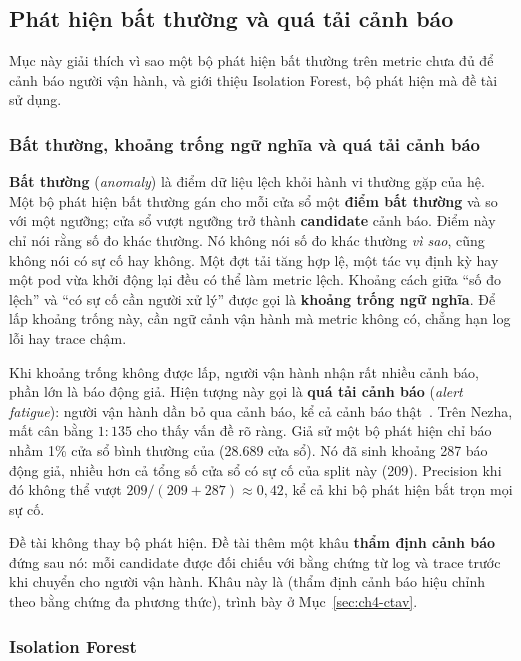 \subsection{Phát hiện bất thường và quá tải cảnh báo}
\label{sec:ch2-phat-hien}

Mục này giải thích vì sao một bộ phát hiện bất thường trên metric chưa đủ để cảnh báo người vận hành, và giới thiệu Isolation Forest, bộ phát hiện mà đề tài sử dụng.

\subsubsection{Bất thường, khoảng trống ngữ nghĩa và quá tải cảnh báo}
\label{sec:ch2-khoang-trong}

\textbf{Bất thường} (\emph{anomaly}) là điểm dữ liệu lệch khỏi hành vi thường gặp của hệ. Một bộ phát hiện bất thường gán cho mỗi cửa sổ một \textbf{điểm bất thường} và so với một ngưỡng; cửa sổ vượt ngưỡng trở thành \textbf{candidate} cảnh báo. Điểm này chỉ nói rằng số đo khác thường. Nó không nói số đo khác thường \emph{vì sao}, cũng không nói có sự cố hay không. Một đợt tải tăng hợp lệ, một tác vụ định kỳ hay một pod vừa khởi động lại đều có thể làm metric lệch. Khoảng cách giữa ``số đo lệch'' và ``có sự cố cần người xử lý'' được gọi là \textbf{khoảng trống ngữ nghĩa}. Để lấp khoảng trống này, cần ngữ cảnh vận hành mà metric không có, chẳng hạn log lỗi hay trace chậm.

Khi khoảng trống không được lấp, người vận hành nhận rất nhiều cảnh báo, phần lớn là báo động giả. Hiện tượng này gọi là \textbf{quá tải cảnh báo} (\emph{alert fatigue}): người vận hành dần bỏ qua cảnh báo, kể cả cảnh báo thật~\cite{zhao2020alertstorm}. Trên Nezha, mất cân bằng $1:135$ cho thấy vấn đề rõ ràng. Giả sử một bộ phát hiện chỉ báo nhầm 1\% cửa sổ bình thường của  (28.689 cửa sổ). Nó đã sinh khoảng 287 báo động giả, nhiều hơn cả tổng số cửa sổ có sự cố của split này (209). Precision khi đó không thể vượt $209 / (209 + 287) \approx 0{,}42$, kể cả khi bộ phát hiện bắt trọn mọi sự cố.

Đề tài không thay bộ phát hiện. Đề tài thêm một khâu \textbf{thẩm định cảnh báo} đứng sau nó: mỗi candidate được đối chiếu với bằng chứng từ log và trace trước khi chuyển cho người vận hành. Khâu này là \CTAV{} (thẩm định cảnh báo hiệu chỉnh theo bằng chứng đa phương thức), trình bày ở Mục~\ref{sec:ch4-ctav}.

\subsubsection{Isolation Forest}
\label{sec:ch2-iforest}


